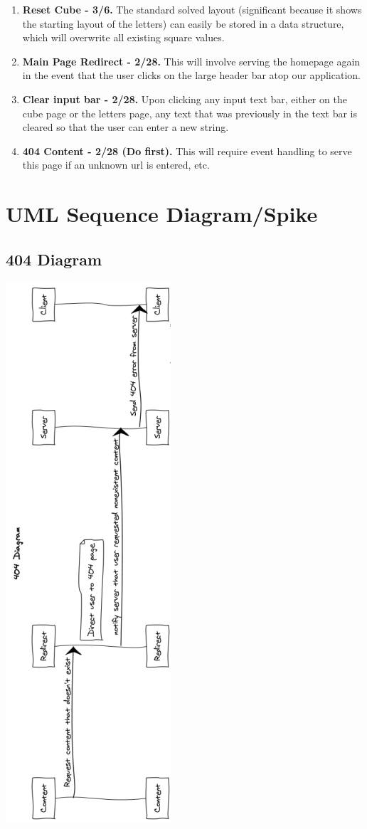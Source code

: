 \documentclass[12pt]{article}
\begin{document}
\begin{enumerate}
	\item \textbf{Reset Cube - 3/6.} The standard solved layout (significant because it shows the starting layout of the letters) can easily be stored in a data structure, which will overwrite all existing square values.
	\item \textbf{Main Page Redirect - 2/28.} This will involve serving the homepage again in the event that the user clicks on the large header bar atop our application.
	\item \textbf{Clear input bar - 2/28.} Upon clicking any input text bar, either on the cube page or the letters page, any text that was previously in the text bar is cleared so that the user can enter a new string.
	\item \textbf{404 Content - 2/28 (Do first).} This will require event handling to serve this page if an unknown url is entered, etc. 
\end{enumerate}

\section{UML Sequence Diagram/Spike}

\subsection{404 Diagram}
\includegraphics[width = .4\textwidth]{dia404.PNG}
\end{document}

